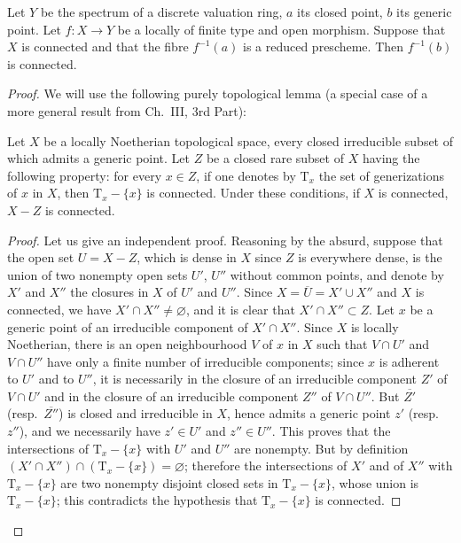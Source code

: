 \begin{lemma}[15.5.6]
\label{IV.15.5.6}
Let $Y$ be the spectrum of a discrete valuation ring, $a$ its closed point, $b$ its generic point.
Let $f:X\to Y$ be a locally of finite type and open morphism.
Suppose that $X$ is connected and that the fibre $f^{-1}(a)$ is a reduced prescheme.
Then $f^{-1}(b)$ is connected.
\end{lemma}

\begin{proof}
We will use the following purely topological lemma (a special case of a more general result from Ch.\ III, 3rd Part):

\begin{lemma}[15.5.6.1]
\label{IV.15.5.6.1}
Let $X$ be a locally Noetherian topological space, every closed irreducible subset of which admits a generic point.
Let $Z$ be a closed rare subset of $X$ having the following property: for every $x\in Z$, if one denotes by $\mathrm{T}_x$ the set of generizations of $x$ in $X$, then $\mathrm{T}_x-\{x\}$ is connected.
Under these conditions, if $X$ is connected, $X-Z$ is connected.
\end{lemma}

\begin{proof}
Let us give an independent proof.
Reasoning by the absurd, suppose that the open set $U=X-Z$, which is dense in $X$ since $Z$ is everywhere dense, is the union of two nonempty open sets $U'$, $U''$ without common points, and denote by $X'$ and $X''$ the closures in $X$ of $U'$ and $U''$.
Since $X=\overline{U}=X'\cup X''$ and $X$ is connected, we have $X'\cap X''\neq\varnothing$, and it is clear that $X'\cap X''\subset Z$.
Let $x$ be a generic point of an irreducible component of $X'\cap X''$.
Since $X$ is locally Noetherian, there is an open neighbourhood $V$ of $x$ in $X$ such that $V\cap U'$ and $V\cap U''$ have only a finite number of irreducible components; since $x$ is adherent to $U'$ and to $U''$, it is necessarily in the closure of an irreducible component $Z'$ of $V\cap U'$ and in the closure of an irreducible component $Z''$ of $V\cap U''$.
But $\overline{Z'}$ (resp.\ $\overline{Z''}$) is closed and irreducible in $X$, hence admits a generic point $z'$ (resp.\ $z''$), and we necessarily have $z'\in U'$ and $z''\in U''$.
This proves that the intersections of $\mathrm{T}_x-\{x\}$ with $U'$ and $U''$ are nonempty.
But by definition $(X'\cap X'')\cap(\mathrm{T}_x-\{x\})=\varnothing$; therefore the intersections of $X'$ and of $X''$ with $\mathrm{T}_x-\{x\}$ are two nonempty disjoint closed sets in $\mathrm{T}_x-\{x\}$, whose union is $\mathrm{T}_x-\{x\}$; this contradicts the hypothesis that $\mathrm{T}_x-\{x\}$ is connected.
\end{proof}
\end{proof}

